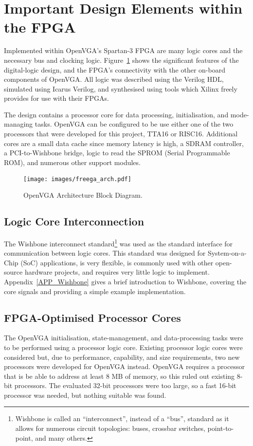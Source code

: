 \section{Important Design Elements within the FPGA}
\label{OPENVGA_Logic_Cores}
Implemented within OpenVGA's Spartan-3 FPGA are many logic cores and the
necessary bus and clocking logic. Figure~\ref{OPENVGA_Arch} shows the significant
features of the digital-logic design, and the FPGA's connectivity with the other
on-board components of OpenVGA. All logic was described using the Verilog HDL,
simulated using Icarus Verilog, and synthesised using tools which Xilinx freely
provides for use with their FPGAs.

The design contains a processor core for data processing, initialisation, and
mode-managing tasks. OpenVGA can be configured to be use either one of the two
processors that were developed for this project, TTA16 or RISC16. Additional
cores are a small data cache since memory latency is high, a SDRAM controller, a
PCI-to-Wishbone bridge, logic to read the SPROM (Serial Programmable ROM),
and numerous other support modules.

\begin{figure}[h!]
\begin{center}
\texttt{[image: images/freega\_arch.pdf]}
\caption[OpenVGA Architecture Block Diagram]{OpenVGA Architecture Block Diagram.}
\label{OPENVGA_Arch}
\end{center}
\end{figure}


\subsection{Logic Core Interconnection}
The Wishbone interconnect standard\footnote{Wishbone is called an
``interconnect'', instead of a ``bus'', standard as it allows for numerous
circuit topologies: buses, crossbar switches, point-to-point, and many others.}
was used as the standard interface for communication between logic cores. This
standard was designed for System-on-a-Chip (SoC) applications, is very flexible, is commonly
used with other open-source hardware projects, and requires very little logic to
implement. Appendix~\ref{APP_Wishbone} gives a brief introduction to Wishbone,
covering the core signals and providing a simple example implementation.


\subsection{FPGA-Optimised Processor Cores}
The OpenVGA initialisation, state-management, and data-processing tasks were to
be performed using a processor logic core. Existing processor logic cores were
considered but, due to performance, capability, and size requirements, two new
processors were developed for OpenVGA instead. OpenVGA requires a processor that
is be able to address at least 8 MB of memory, so this ruled out existing 8-bit
processors. The evaluated 32-bit processors were too large, so a fast 16-bit
processor was needed, but nothing suitable was found.

